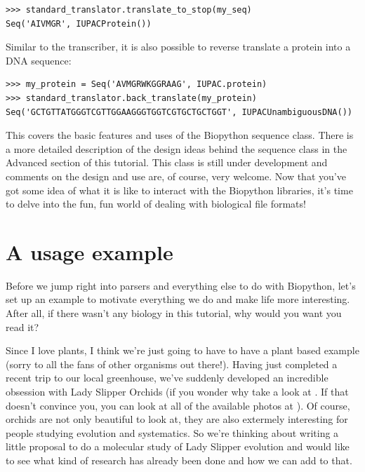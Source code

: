 \documentclass{report}
\begin{document}
\begin{verbatim}
>>> standard_translator.translate_to_stop(my_seq)
Seq('AIVMGR', IUPACProtein())
\end{verbatim}

Similar to the transcriber, it is also possible to reverse translate a protein into a DNA sequence:

\begin{verbatim}
>>> my_protein = Seq('AVMGRWKGGRAAG', IUPAC.protein)
>>> standard_translator.back_translate(my_protein)
Seq('GCTGTTATGGGTCGTTGGAAGGGTGGTCGTGCTGCTGGT', IUPACUnambiguousDNA())
\end{verbatim}

This covers the basic features and uses of the Biopython sequence class. There is a more detailed description of the design ideas behind the sequence class in the Advanced section of this tutorial. This class is still under development and comments on the design and use are, of course, very welcome. Now that you've got some idea of what it is like to interact with the Biopython libraries, it's time to delve into the fun, fun world of dealing with biological file formats!

\section{A usage example}
\label{sec:orchids}

Before we jump right into parsers and everything else to do with Biopython, let's set up an example to motivate everything we do and make life more interesting. After all, if there wasn't any biology in this tutorial, why would you want you read it?


Since I love plants, I think we're just going to have to have a plant based example (sorry to all the fans of other organisms out there!).  Having just completed a recent trip to our local greenhouse, we've suddenly developed an incredible obsession with Lady Slipper Orchids (if you wonder why take a look at . If that doesn't convince you, you can look at all of the available photos at  ).  Of course, orchids are not only beautiful to look at, they are also extermely interesting for people studying evolution and systematics. So we're thinking about writing a little proposal to do a molecular study of Lady Slipper evolution and would like to see what kind of research has already been done and how we can add to that.
\end{document}
